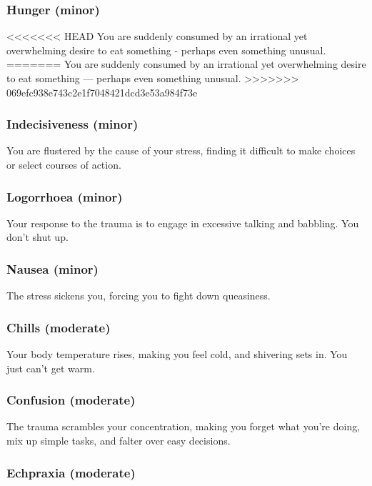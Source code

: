 \subsubsection{Hunger (minor)}

<<<<<<< HEAD
You are suddenly consumed by an irrational yet overwhelming desire to eat something - perhaps even something unusual.
=======
You are suddenly consumed by an irrational yet overwhelming desire to eat something --- perhaps even something unusual.
>>>>>>> 069efc938e743c2e1f7048421dcd3e53a984f73e

\subsubsection{Indecisiveness (minor)}

You are flustered by the cause of your stress, finding it difficult to make choices or select courses of action.

\subsubsection{Logorrhoea (minor)}

Your response to the trauma is to engage in excessive talking and babbling. You don’t shut up.

\subsubsection{Nausea (minor)}

The stress sickens you, forcing you to fight down queasiness.

\subsubsection{Chills (moderate)}

Your body temperature rises, making you feel cold, and shivering sets in. You just can’t get warm.

\subsubsection{Confusion (moderate)}

The trauma scrambles your concentration, making you forget what you’re doing, mix up simple tasks, and falter over easy decisions.

\subsubsection{Echpraxia (moderate)}

